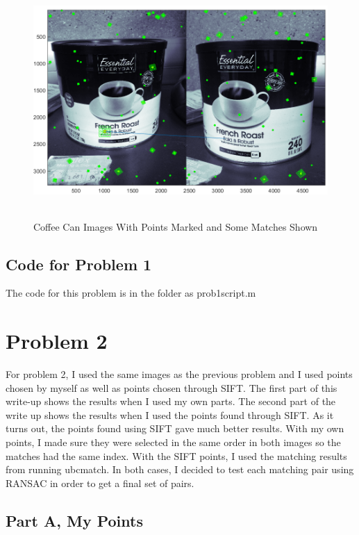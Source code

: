 \documentclass[11pt,psfig]{article}
\begin{document}
\begin{figure}[H]
\centering
\includegraphics[height=3.5in]{coffeeCan_pointsWithMatching.png}
\caption{Coffee Can Images With Points Marked and Some Matches Shown}
\label{cc3}
\end{figure}

\subsection*{Code for Problem 1}

The code for this problem is in the folder as prob1script.m

\newpage

\section*{Problem 2}

For problem 2, I used the same images as the previous problem and I used points chosen by myself as well as points chosen through SIFT. The first part of this write-up shows the results when I used my own parts. The second part of the write up shows the results when I used the points found through SIFT. As it turns out, the points found using SIFT gave much better results. With my own points, I made sure they were selected in the same order in both images so the matches had the same index. With the SIFT points, I used the matching results from running ubcmatch. In both cases, I decided to test each matching pair using RANSAC in order to get a final set of pairs. 

\subsection*{Part A, My Points}
\end{document}
